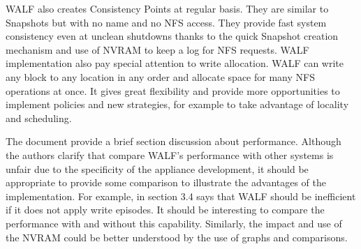 \documentclass[a4paper,10pt]{scrartcl}
\begin{document}
WALF also creates Consistency Points at regular basis.  They are similar to Snapshots but with no name and no NFS access.  They provide fast system consistency even at unclean shutdowns thanks to the quick Snapshot creation mechanism and use of NVRAM to keep a log for NFS requests.  WALF implementation also pay special attention to write allocation.  WALF can write any block to any location in any order and allocate space for many NFS operations at once.  It gives great flexibility and provide more opportunities to implement policies and new strategies, for example to take advantage of locality and scheduling.

The document provide a brief section discussion about performance.  Although the authors clarify that compare WALF's performance with other systems is unfair due to the specificity of the appliance development, it should be appropriate to provide some comparison to illustrate the advantages of the implementation.  For example, in section 3.4 says that WALF should be inefficient if it does not apply write episodes.  It should be interesting to compare the performance with and without this capability.  Similarly, the impact and use of the NVRAM could be better understood by the use of graphs and comparisons. 

\end{document}
